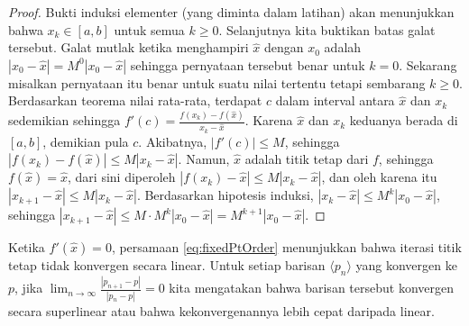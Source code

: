 \begin{proof}
Bukti induksi elementer (yang diminta dalam latihan) akan menunjukkan
bahwa $x_{k}\in[a,b]$ untuk semua $k\geq0$. Selanjutnya kita buktikan
batas galat tersebut. Galat mutlak ketika menghampiri $\hat{x}$ dengan
$x_{0}$ adalah $|x_{0}-\hat{x}|=M^{0}|x_{0}-\hat{x}|$ sehingga pernyataan
tersebut benar untuk $k=0$. Sekarang misalkan pernyataan itu benar
untuk suatu nilai tertentu tetapi sembarang $k\geq0$. Berdasarkan
teorema nilai rata-rata, terdapat $c$ dalam interval antara $\hat{x}$
dan $x_{k}$ sedemikian sehingga $f'(c)=\frac{f(x_{k})-f(\hat{x})}{x_{k}-\hat{x}}$.
Karena $\hat{x}$ dan $x_{k}$ keduanya berada di $[a,b]$, demikian
pula $c$. Akibatnya, $|f'(c)|\leq M$, sehingga $|f(x_{k})-f(\hat{x})|\leq M|x_{k}-\hat{x}|$.
Namun, $\hat{x}$ adalah titik tetap dari $f$, sehingga $f(\hat{x})=\hat{x}$,
dari sini diperoleh $|f(x_{k})-\hat{x}|\leq M|x_{k}-\hat{x}|$, dan
oleh karena itu $|x_{k+1}-\hat{x}|\leq M|x_{k}-\hat{x}|$. Berdasarkan
hipotesis induksi, $|x_{k}-\hat{x}|\leq M^{k}|x_{0}-\hat{x}|$, sehingga
$|x_{k+1}-\hat{x}|\leq M\cdot M^{k}|x_{0}-\hat{x}|=M^{k+1}|x_{0}-\hat{x}|$.
\end{proof}
Ketika $f'(\hat{x})=0$, persamaan \ref{eq:fixedPtOrder} menunjukkan
bahwa iterasi titik tetap tidak konvergen secara linear. Untuk setiap
barisan $\langle p_{n}\rangle$ yang konvergen ke $p$, jika $\lim_{n\to\infty}\frac{|p_{n+1}-p|}{|p_{n}-p|}=0$
kita mengatakan bahwa barisan tersebut konvergen secara superlinear
 atau bahwa kekonvergenannya lebih
cepat daripada linear.

